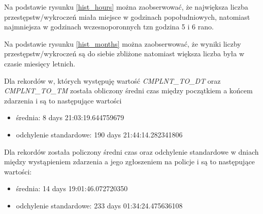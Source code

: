 \documentclass{classrep}
\begin{document}
{{{                Na podstawie rysunku \ref{hist_hours} można zaobserwować, że największa
                liczba przestępstw/wykroczeń miała miejsce w godzinach popołudniowych,
                natomiast najmniejsza w godzinach wczesnoporonnych tzn godzina 5 i 6 rano.

                Na podstawie rysunku \ref{hist_months} można zaobserwować, że wyniki
                liczby przestępstw/wykroczeń są do siebie zbliżone natomiast większa
                liczba była w czasie miesięcy letnich.

                Dla rekordów w, których występuję wartość \emph{CMPLNT\_TO\_DT} oraz
                \emph{CMPLNT\_TO\_TM} została obliczony średni czas między początkiem a
                końcem zdarzenia i są to następujące wartości
                \begin{itemize}
                    \item średnia: 8 days 21:03:19.644759679
                    \item odchylenie standardowe: 190 days 21:44:14.282341806
                \end{itemize}

                Dla rekordów została policzony średni czas oraz odchylenie standardowe
                w dniach między wystąpieniem zdarzenia a jego zgłoszeniem na policje i
                są to następujące wartości:
                \begin{itemize}
                    \item średnia: 14 days 19:01:46.072720350
                    \item odchylenie standardowe: 233 days 01:34:24.475636108
                \end{itemize}
            
            }

}}
\end{document}
